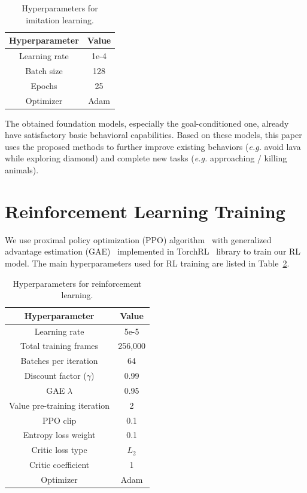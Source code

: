\begin{onecolumn}
\begin{table}[h]
\renewcommand\arraystretch{1.4}
\setlength\tabcolsep{4pt}
\footnotesize
\centering		
\caption{Hyperparameters for imitation learning.}
\label{tab:hyperparameter_il}
\resizebox{0.22\textwidth}{!}
{
    \begin{tabular}{cc}
    \toprule
     \textbf{Hyperparameter} & \textbf{Value} \\
     \hline
     Learning rate & 1e-4 \\
     Batch size & 128 \\
     Epochs & 25 \\
     Optimizer & Adam \\
    
    \bottomrule
    \end{tabular}
} 
\end{table}

The obtained foundation models, especially the goal-conditioned one, already have satisfactory basic behavioral capabilities. Based on these models, this paper uses the proposed methods to further improve existing behaviors (\emph{e.g.} avoid lava while exploring diamond) and complete new tasks (\emph{e.g.} approaching / killing animals).

\clearpage
\section{Reinforcement Learning Training} 
We use proximal policy optimization (PPO) algorithm~\cite{schulman2017proximal} with generalized advantage estimation (GAE)~\cite{schulman2015high} implemented in TorchRL~\cite{bou2023torchrl} library to train our RL model. 
The main hyperparameters used for RL training are listed in Table~\ref{tab:hyperparameter_rl}.

\begin{table}[h]
\renewcommand\arraystretch{1.4}
\setlength\tabcolsep{4pt}
\footnotesize
\centering		
\caption{Hyperparameters for reinforcement learning.}
\label{tab:hyperparameter_rl}
\resizebox{0.3\textwidth}{!}
{
    \begin{tabular}{cc}
    \toprule
     \textbf{Hyperparameter} & \textbf{Value} \\
     \hline
     Learning rate & 5e-5 \\
     Total training frames & 256,000 \\
     Batches per iteration & 64 \\
     Discount factor ($\gamma$) & 0.99 \\
     GAE $\lambda$ & 0.95 \\
     Value pre-training iteration & 2 \\
     PPO clip & 0.1 \\
     Entropy loss weight & 0.1 \\
     Critic loss type & $L_{2}$ \\
     Critic coefficient & 1 \\
     Optimizer & Adam \\
    \bottomrule
    \end{tabular}
} 
\end{table}


\end{onecolumn}
